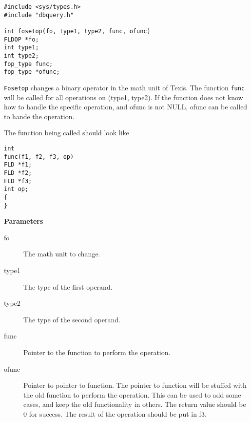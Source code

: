\SYNOPSIS
\begin{verbatim}
#include <sys/types.h>
#include "dbquery.h"

int fosetop(fo, type1, type2, func, ofunc)
FLDOP *fo;
int type1;
int type2;
fop_type func;
fop_type *ofunc;
\end{verbatim}

\DESCRIPTION

{\tt Fosetop} changes a binary operator in the math unit of Texis.  The
function {\tt func} will be called for all operations on (type1, type2). If
the function does not know how to handle the specific operation, and ofunc
is not NULL, ofunc can be called to hande the operation.

The function being called should look like
\begin{verbatim}
int
func(f1, f2, f3, op)
FLD *f1;
FLD *f2;
FLD *f3;
int op;
{
}
\end{verbatim}

{\bf Parameters}
\begin{description}
\item[fo] The math unit to change.
\item[type1] The type of the first operand.
\item[type2] The type of the second operand.
\item[func] Pointer to the function to perform the operation.
\item[ofunc] Pointer to pointer to function.  The pointer to function will
be stuffed with the old function to perform the operation.  This can be
used to add some cases, and keep the old functionality in others.  The
return value should be 0 for success.  The result of the operation should
be put in f3.

\end{description}

